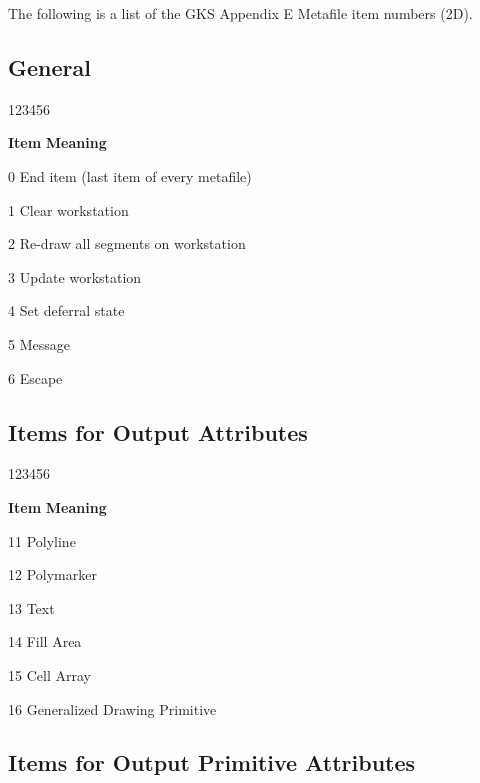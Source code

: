 The following is a list of the GKS Appendix E Metafile item numbers (2D).

\subsection*{General}

\begin{DLtt}{123456}
\item[{\rm\bf Item}] {\bf Meaning}
\item[0]End item (last item of every metafile)
\item[1]Clear workstation
\item[2]Re-draw all segments on workstation
\item[3]Update workstation
\item[4]Set deferral state
\item[5]Message
\item[6]Escape
\end{DLtt}

\subsection*{Items for Output Attributes}

\begin{DLtt}{123456}
\item[{\rm\bf Item}] {\bf Meaning}
\item[11]Polyline
\item[12]Polymarker
\item[13]Text
\item[14]Fill Area
\item[15]Cell Array
\item[16]Generalized Drawing Primitive
\end{DLtt}

\subsection*{Items for Output Primitive Attributes}

